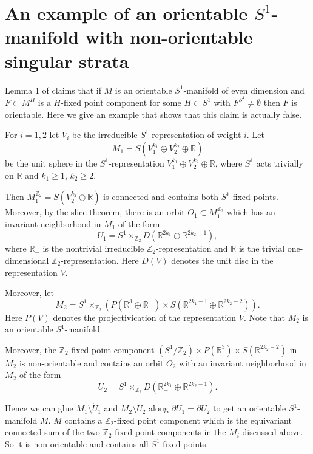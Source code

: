 \documentclass[a4paper, 11pt]{amsart}
\theoremstyle{definition}
\theoremstyle{remark}
\numberwithin{equation}{section}
\begin{document}
\section{An example of an orientable $S^1$-manifold with non-orientable singular strata}
\label{sec:count-lemma-1}

Lemma 1 of \cite{MR1979364} claims that if \(M\) is an orientable \(S^1\)-manifold of even dimension and \(F\subset M^H\) is a \(H\)-fixed point component for some \(H\subset S^1\) with \(F^{S^1}\neq \emptyset\) then \(F\) is orientable.
Here we give an example that shows that this claim is actually false.

For \(i=1,2\) let \(V_i\) be the irreducible \(S^1\)-representation of weight \(i\).
Let \[M_1=S(V_1^{k_1}\oplus V_2^{k_2}\oplus \mathbb{R})\] be the unit sphere in the \(S^1\)-representation \(V_1^{k_1}\oplus V_2^{k_2}\oplus \mathbb{R}\), where \(S^1\) acts trivially on \(\mathbb{R}\) and \(k_1\geq 1\), \(k_2\geq 2\).

Then \(M_1^{\mathbb{Z}_2}=S(V_2^{k_2}\oplus \mathbb{R})\) is connected and contains both \(S^1\)-fixed points. Moreover, by the slice theorem, there is an orbit \(O_1\subset M_1^{\mathbb{Z}_2}\) which has an invariant neighborhood in \(M_1\) of the form
\[U_1=S^1\times_{\mathbb{Z}_2} D(\mathbb{R}_-^{2k_1}\oplus \mathbb{R}^{2k_2-1}),\]
where \(\mathbb{R}_-\) is the nontrivial irreducible \(\mathbb{Z}_2\)-representation and \(\mathbb{R}\) is the trivial one-dimensional \(\mathbb{Z}_2\)-representation. Here \(D(V)\) denotes the unit disc in the representation \(V\).

Moreover, let
\[M_2=S^1\times_{\mathbb{Z}_2}(P(\mathbb{R}^3\oplus \mathbb{R}_-)\times S(\mathbb{R}_-^{2k_1-1}\oplus \mathbb{R}^{2k_2-2})).\]
Here \(P(V)\) denotes the projectivication of the representation \(V\).
Note that \(M_2\) is an orientable \(S^1\)-manifold.

Moreover, the \(\mathbb{Z}_2\)-fixed point component \((S^1/\mathbb{Z}_2)\times P(\mathbb{R}^3)\times S(\mathbb{R}^{2k_2-2})\) in \(M_2\) is non-orientable and contains an orbit \(O_2\) with an invariant neighborhood in \(M_2\) of the form
\[U_2=S^1\times_{\mathbb{Z}_2} D(\mathbb{R}_-^{2k_1}\oplus \mathbb{R}^{2k_2-1}).\]

Hence we can glue \(M_1\setminus \dot{U}_1\) and \(M_2\setminus \dot{U}_2\) along \(\partial U_1=\partial U_2\) to get an orientable \(S^1\)-manifold \(M\).
\(M\) contains a \(\mathbb{Z}_2\)-fixed point component which is the equivariant connected sum of the two \(\mathbb{Z}_2\)-fixed point components in the \(M_i\) discussed above. So it is non-orientable and contains all \(S^1\)-fixed points.
\end{document}
